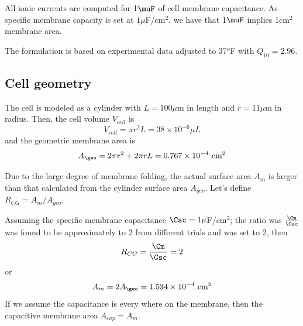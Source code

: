 All ionic currents are computed for 1$\muF$ of cell membrane
capacitance. As specific membrane capacity is set at $1\mu$F/cm$^2$,
we have that 1$\muF$ implies 1cm$^2$ membrane area. 

The formulation is based on experimental data adjusted to 37$^o$F with
$Q_{10}=2.96$. 

\subsection{Cell geometry}
\label{sec:cell-geometry}


The cell is modeled as a cylinder with $L=100\mu$m in length and
$r=11\mu$m in radius. Then, the cell volume $V_{cell}$ is
\begin{equation}
  \label{eq:758}
  V_{cell} = \pi r^2L = 38\times 10^{-6}\mu L
\end{equation}
and the geometric membrane area is
\begin{equation}
  \label{eq:1258}
   A_\geo = 2\pi r^2 + 2\pi rL = 0.767\times 10^{-4} \text{ cm}^2
\end{equation}

Due to the large degree of membrane folding, the actual surface area
$A_m$ is larger than that calculated from the cylinder surface area
$A_{geo}$. Let's define $R_{CG} = A_m/A_{geo}$.

Assuming the specific membrane capacitance $\Csc=1\mu$F/cm$^2$; the
ratio was $\frac{\Cm}{\Csc}$ was found to be approximately to 2 from
different trials and was set to 2, then
\begin{equation}
  \label{eq:725}
  R_{CG} = \frac{\Cm}{\Csc} = 2
\end{equation}
or
\begin{equation}
  \label{eq:1259}
  A_m = 2 A_\geo = 1.534\times 10^{-4} \text{ cm}^2
\end{equation}
If we assume the capacitance is every where on the membrane, then the
capacitive membrane area $A_{cap}=A_m$.

